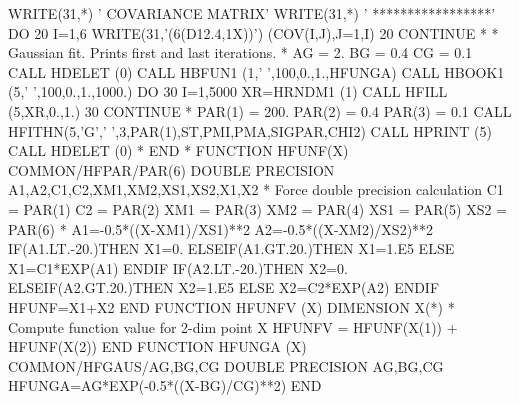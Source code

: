 \begin{XMP}
      WRITE(31,*) ' COVARIANCE MATRIX'
      WRITE(31,*) ' *****************'
      DO 20 I=1,6
        WRITE(31,'(6(D12.4,1X))') (COV(I,J),J=1,I)
   20 CONTINUE
*
*       Gaussian fit. Prints first and last iterations.
*
      AG = 2.
      BG = 0.4
      CG = 0.1
      CALL HDELET (0)
      CALL HBFUN1 (1,' ',100,0.,1.,HFUNGA)
      CALL HBOOK1 (5,' ',100,0.,1.,1000.)
      DO 30 I=1,5000
         XR=HRNDM1 (1)
         CALL HFILL (5,XR,0.,1.)
   30 CONTINUE
*
      PAR(1) = 200.
      PAR(2) = 0.4
      PAR(3) = 0.1
      CALL HFITHN(5,'G',' ',3,PAR(1),ST,PMI,PMA,SIGPAR,CHI2)
      CALL HPRINT (5)
      CALL HDELET (0)
*
      END
*
      FUNCTION HFUNF(X)
      COMMON/HFPAR/PAR(6)
      DOUBLE PRECISION A1,A2,C1,C2,XM1,XM2,XS1,XS2,X1,X2
*       Force double precision calculation
      C1  = PAR(1)
      C2  = PAR(2)
      XM1 = PAR(3)
      XM2 = PAR(4)
      XS1 = PAR(5)
      XS2 = PAR(6)
*
      A1=-0.5*((X-XM1)/XS1)**2
      A2=-0.5*((X-XM2)/XS2)**2
      IF(A1.LT.-20.)THEN
         X1=0.
      ELSEIF(A1.GT.20.)THEN
         X1=1.E5
      ELSE
         X1=C1*EXP(A1)
      ENDIF
      IF(A2.LT.-20.)THEN
         X2=0.
      ELSEIF(A2.GT.20.)THEN
         X2=1.E5
      ELSE
         X2=C2*EXP(A2)
      ENDIF
      HFUNF=X1+X2
      END
      FUNCTION HFUNFV (X)
      DIMENSION X(*)
*         Compute function value for 2-dim point X
      HFUNFV = HFUNF(X(1)) + HFUNF(X(2))
      END
      FUNCTION HFUNGA (X)
      COMMON/HFGAUS/AG,BG,CG
      DOUBLE PRECISION AG,BG,CG
      HFUNGA=AG*EXP(-0.5*((X-BG)/CG)**2)
      END
\end{XMP}
\newpage
